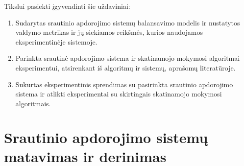 \documentclass{VUMIFPSbakalaurinis}
\begin{document}
Tikslui pasiekti įgyvendinti šie uždaviniai:

\begin{enumerate}
    \item Sudarytas srautinio apdorojimo sistemų balansavimo modelis ir nustatytos valdymo metrikas ir jų siekiamos reikšmės, kurios naudojamos eksperimentinėje sistemoje.
    \item Parinkta srautinė apdorojimo sistema ir skatinamojo mokymosi algoritmai eksperimentui, atsirenkant iš algoritmų ir sistemų, aprašomų literatūroje.
    \item Sukurtas eksperimentinis sprendimas su pasirinkta srautinio apdorojimo sistema ir atlikti eksperimentai su skirtingais skatinamojo mokymosi algoritmais.
\end{enumerate}

\section{Srautinio apdorojimo sistemų matavimas ir derinimas}
\end{document}
